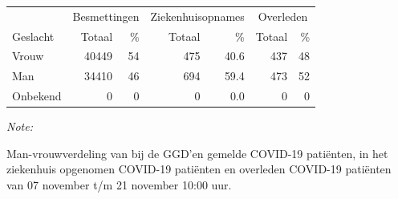 \documentclass[
  english,
  man,floatsintext]{apa6}
\begin{document}
\begin{table}[H]
\centering\begingroup\fontsize{11}{13}\selectfont

\begin{threeparttable}
\begin{tabular}{lrrrrrr}
\toprule
\multicolumn{1}{c}{ } & \multicolumn{2}{c}{Besmettingen} & \multicolumn{2}{c}{Ziekenhuisopnames} & \multicolumn{2}{c}{Overleden} \\
\cmidrule(l{3pt}r{3pt}){2-3} \cmidrule(l{3pt}r{3pt}){4-5} \cmidrule(l{3pt}r{3pt}){6-7}
Geslacht & Totaal & \% & Totaal & \% & Totaal & \%\\
\midrule
Vrouw & 40449 & 54 & 475 & 40.6 & 437 & 48\\
Man & 34410 & 46 & 694 & 59.4 & 473 & 52\\
Onbekend & 0 & 0 & 0 & 0.0 & 0 & 0\\
\bottomrule
\end{tabular}
\begin{tablenotes}
\item \textit{Note: } 
\item Man-vrouwverdeling van bij de GGD’en gemelde COVID-19 patiënten, in het ziekenhuis opgenomen COVID-19 patiënten en overleden COVID-19 patiënten van 07 november t/m 21 november 10:00 uur.
\end{tablenotes}
\end{threeparttable}
\endgroup{}
\end{table}
\newpage
\end{document}
